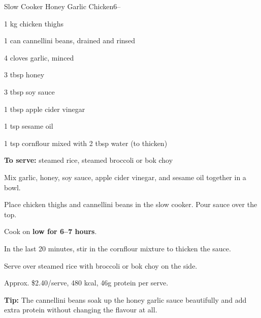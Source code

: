 \begin{recipebox}{Slow Cooker Honey Garlic Chicken}{6}{--}
\begin{ingredients}
  \item 1 kg chicken thighs
  \item 1 can cannellini beans, drained and rinsed
  \item 4 cloves garlic, minced
  \item 3 tbsp honey
  \item 3 tbsp soy sauce
  \item 1 tbsp apple cider vinegar
  \item 1 tsp sesame oil
  \item 1 tsp cornflour mixed with 2 tbsp water (to thicken)
  \item \textbf{To serve:} steamed rice, steamed broccoli or bok choy
\end{ingredients}

\begin{method}
  \item Mix garlic, honey, soy sauce, apple cider vinegar, and sesame oil together in a bowl.
  \item Place chicken thighs and cannellini beans in the slow cooker. Pour sauce over the top.
  \item Cook on \textbf{low for 6--7 hours}.
  \item In the last 20 minutes, stir in the cornflour mixture to thicken the sauce.
  \item Serve over steamed rice with broccoli or bok choy on the side.
\end{method}

\begin{notelist}
  \item Approx. \$2.40/serve, 480 kcal, 46g protein per serve.
  \item \textbf{Tip:} The cannellini beans soak up the honey garlic sauce beautifully and add extra protein without changing the flavour at all.
\end{notelist}
\end{recipebox}
